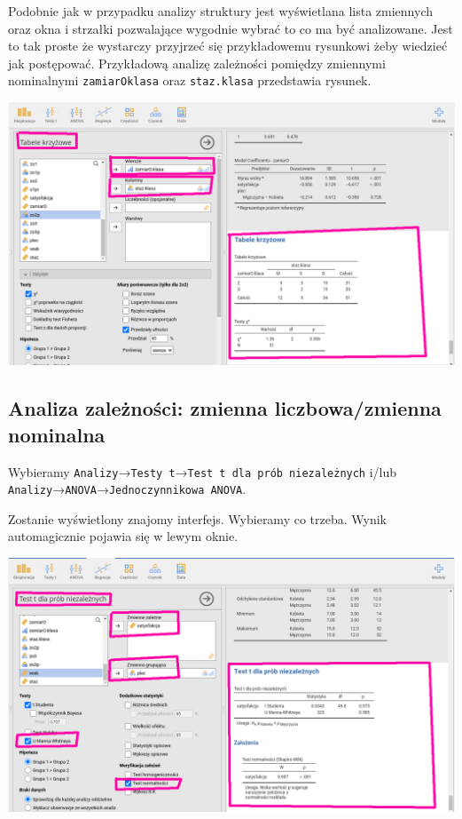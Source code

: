 \documentclass[
  openany]{book}
\begin{document}
Podobnie jak w przypadku analizy struktury jest wyświetlana
lista zmiennych oraz okna i strzałki pozwalające
wygodnie wybrać to co ma być analizowane. Jest to tak proste
że wystarczy przyjrzeć się przykładowemu rysunkowi żeby
wiedzieć jak postępować. Przykładową analizę zależności
pomiędzy zmiennymi nominalnymi \texttt{zamiarOklasa} oraz \texttt{staz.klasa} przedstawia rysunek.

\includegraphics{./tabele_krzyzowe.png}

\hypertarget{analiza-zaleux17cnoux15bci-zmienna-liczbowazmienna-nominalna}{%
\subsection{Analiza zależności: zmienna liczbowa/zmienna nominalna}\label{analiza-zaleux17cnoux15bci-zmienna-liczbowazmienna-nominalna}}

Wybieramy \texttt{Analizy}→\texttt{Testy\ t}→\texttt{Test\ t\ dla\ prób\ niezależnych} i/lub
\texttt{Analizy}→\texttt{ANOVA}→\texttt{Jednoczynnikowa\ ANOVA}.

Zostanie wyświetlony znajomy interfejs. Wybieramy
co trzeba. Wynik automagicznie pojawia się w lewym oknie.

\includegraphics{./testy.png}
\end{document}
